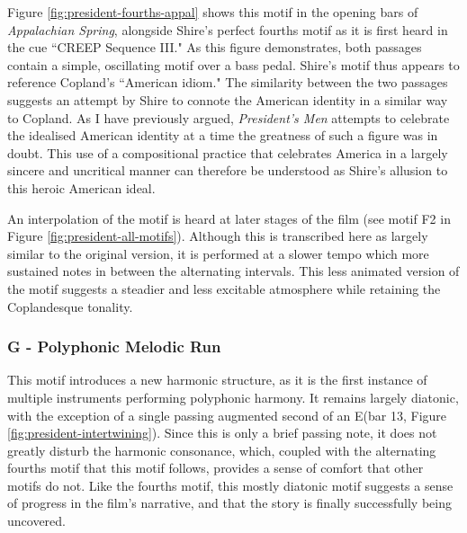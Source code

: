 Figure \ref{fig:president-fourths-appal} shows this motif in the opening bars of \textit{Appalachian Spring}, alongside Shire's perfect fourths motif as it is first heard in the cue ``CREEP Sequence III."
As this figure demonstrates, both passages contain a simple, oscillating motif over a bass pedal.
Shire's motif thus appears to reference Copland's ``American idiom."\autocites[This phrase is taken from W. H. Mellers' discussion of ``American music," wherein he identifies several compositional practices that make up the ``American idiom." One of the key traits he identifies, and the most relevant for my discussion here is the ``feeling of vastness, enormous airiness and emptiness of space which probably derives from America's physical immensity and which is communicated through the music partly by the dominance of fourths and natural sevenths."][370-371]{mellers_american_1943}
The similarity between the two passages suggests an attempt by Shire to connote the American identity in a similar way to Copland.
As I have previously argued, \textit{President's Men} attempts to celebrate the idealised American identity at a time the greatness of such a figure was in doubt.
This use of a compositional practice that celebrates America in a largely sincere and uncritical manner can therefore be understood as Shire's allusion to this heroic American ideal.

An interpolation of the motif is heard at later stages of the film (see motif F2 in Figure \ref{fig:president-all-motifs}).
Although this is transcribed here as largely similar to the original version, it is performed at a slower tempo which more sustained notes in between the alternating intervals.
This less animated version of the motif suggests a steadier and less excitable atmosphere while retaining the Coplandesque tonality.

\subsubsection{G - Polyphonic Melodic Run
}
This motif introduces a new harmonic structure, as it is the first instance of multiple instruments performing polyphonic harmony.
It remains largely diatonic, with the exception of a single passing augmented second of an E\natural (bar 13, Figure \ref{fig:president-intertwining}).
Since this is only a brief passing note, it does not greatly disturb the harmonic consonance, which, coupled with the alternating fourths motif that this motif follows, provides a sense of comfort that other motifs do not.
Like the fourths motif, this mostly diatonic motif suggests a sense of progress in the film's narrative, and that the story is finally successfully being uncovered.

